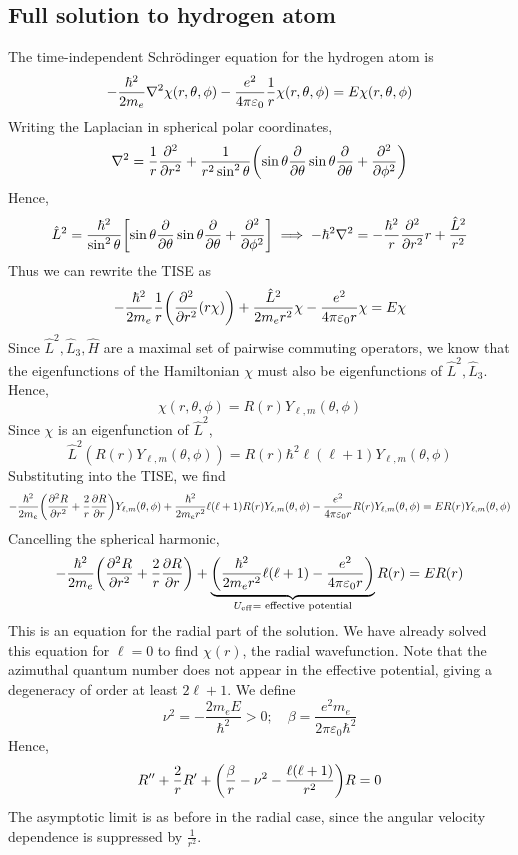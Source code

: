 \subsection{Full solution to hydrogen atom}
The time-independent Schr\"odinger equation for the hydrogen atom is
\[
	-\frac{\hbar^2}{2m_e} \laplacian{\chi(r, \theta, \phi)} - \frac{e^2}{4 \pi \varepsilon_0} \frac{1}{r} \chi(r, \theta, \phi) = E \chi(r,\theta, \phi)
\]
Writing the Laplacian in spherical polar coordinates,
\[
	\laplacian{} = \frac{1}{r} \pdv[2]{r} + \frac{1}{r^2 \sin^2 \theta} \qty( \sin \theta \pdv{\theta} \sin \theta \pdv{\theta} + \pdv[2]{\phi} )
\]
Hence,
\[
	\hat L^2 = \frac{\hbar^2}{\sin^2\theta} \qty[ \sin \theta \pdv{\theta} \sin \theta \pdv{\theta} + \pdv[2]{\phi} ] \implies -\hbar^2 \laplacian{} = -\frac{\hbar^2}{r} \pdv[2]{r} r + \frac{\hat L^2}{r^2}
\]
Thus we can rewrite the TISE as
\[
	-\frac{\hbar^2}{2m_e} \frac{1}{r} \qty( \pdv[2]{r} \qty(r \chi) ) + \frac{\hat L^2}{2 m_e r^2} \chi - \frac{e^2}{4 \pi \varepsilon_0 r} \chi = E \chi
\]
Since \( \hat L^2, \hat L_3, \hat H \) are a maximal set of pairwise commuting operators, we know that the eigenfunctions of the Hamiltonian \( \chi \) must also be eigenfunctions of \( \hat L^2, \hat L_3 \).
Hence,
\[
	\chi(r,\theta,\phi) = R(r) Y_{\ell, m}(\theta, \phi)
\]
Since \( \chi \) is an eigenfunction of \( \hat L^2 \),
\[
	\hat L^2 (R(r) Y_{\ell,m}(\theta,\phi)) = R(r) \hbar^2 \ell (\ell+1)Y_{\ell,m}(\theta, \phi)
\]
Substituting into the TISE, we find
\[
	-\frac{\hbar^2}{2m_e} \qty( \pdv[2]{R}{r} + \frac{2}{r} \pdv{R}{r} ) Y_{\ell,m}(\theta, \phi) + \frac{\hbar^2}{2 m_e r^2} \ell(\ell+1) R(r)Y_{\ell,m}(\theta, \phi) - \frac{e^2}{4 \pi \varepsilon_0 r} R(r)Y_{\ell,m}(\theta,\phi) = E R(r)Y_{\ell,m}(\theta,\phi)
\]
Cancelling the spherical harmonic,
\[
	-\frac{\hbar^2}{2m_e} \qty( \pdv[2]{R}{r} + \frac{2}{r} \pdv{R}{r} ) + \underbrace{\qty(\frac{\hbar^2}{2 m_e r^2} \ell(\ell+1) - \frac{e^2}{4 \pi \varepsilon_0 r})}_{U_{\mathrm{eff}} = \text{ effective potential}} R(r) = E R(r)
\]
This is an equation for the radial part of the solution.
We have already solved this equation for \( \ell = 0 \) to find \( \chi(r) \), the radial wavefunction.
Note that the azimuthal quantum number does not appear in the effective potential, giving a degeneracy of order at least \( 2 \ell + 1 \).
We define
\[
	\nu^2 = -\frac{2m_e E}{\hbar^2} > 0;\quad \beta = \frac{e^2 m_e}{2 \pi \varepsilon_0 \hbar^2}
\]
Hence,
\[
	R'' + \frac{2}{r} R' + \qty(\frac{\beta}{r} - \nu^2 - \frac{\ell(\ell+1)}{r^2})R = 0
\]
The asymptotic limit is as before in the radial case, since the angular velocity dependence is suppressed by \( \frac{1}{r^2} \).
